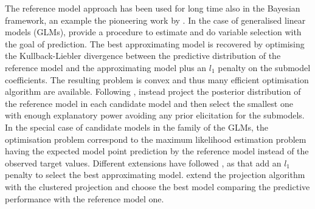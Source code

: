 \documentclass[american,]{article}
\theoremstyle{definition}
\begin{document}
The reference model approach has been used for long time also in the Bayesian framework, an example the pioneering work by \cite{paper:reference_lindley}. In the case of generalised linear models (GLMs), \cite{paper:tran_predictivelasso} provide a procedure to estimate and do variable selection with the goal of prediction. The best approximating model is recovered by optimising the Kullback-Liebler divergence between the predictive distribution of the reference model and the approximating model plus an $l_{1}$ penalty on the submodel coefficients. The resulting problem is convex and thus many efficient optimisation algorithm are available. Following \cite{paper:goutis_projection}, \cite{paper:original_proj}  instead project the posterior distribution of the reference model in each candidate model and then select the smallest one with enough explanatory power avoiding any prior elicitation for the submodels. In the special case of candidate models in the family of the GLMs, the optimisation problem correspond to the maximum likelihood estimation problem having the expected model point prediction by the reference model instead of the observed target values. Different extensions have followed \cite{paper:original_proj}, as \cite{paper:nott_projection} that add an $l_{1}$ penalty to select the best approximating model. \cite{paper:projpred} extend the projection algorithm with the clustered projection and choose the best model comparing the predictive performance with the reference model one.

\end{document}
